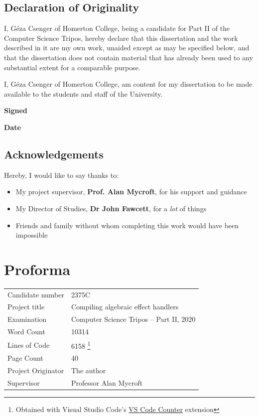 \documentclass[%
    12pt,
    bibliography=toc,
    listof=leveldown,%
    oneside
]{book}
\begin{document}


\frontmatter

\section*{Declaration of Originality}

I, Géza Csenger of Homerton College, being a candidate for Part II of the 
Computer Science Tripos, hereby declare that this dissertation and the work
described in it are my own work, unaided except as may be specified below, and
that the dissertation does not contain material that has already been used to
any substantial extent for a comparable purpose.

I, Géza Csenger of Homerton College,
am content for my dissertation to be made available to the students and staff
of the University. 

\vspace{1cm}
\textbf{Signed}

\vspace{1cm}
\textbf{Date}

\vspace{3cm}

\section*{Acknowledgements}

Hereby, I would like to say thanks to:
\begin{itemize}
    \item My project supervisor, \textbf{Prof. Alan Mycroft}, for his support
        and guidance
    \item My Director of Studies, \textbf{Dr John Fawcett}, for a \emph{lot} of
        things
    \item Friends and family without whom completing this work would have been
        impossible
\end{itemize}

\newpage

\chapter{Proforma}
\begin{tabularx}{\textwidth}{@{} ll @{}}
Candidate number & 2375C \\
Project title & Compiling algebraic effect handlers \\
Examination & Computer Science Tripos -- Part II, 2020 \\
Word Count & 10314 \\
Lines of Code & 6158
\footnote{Obtained with Visual Studio Code's \href{https://marketplace.visualstudio.com/items?itemName=uctakeoff.vscode-counter}{VS Code Counter} extension} \\
Page Count & 40 \\
Project Originator & The author \\
Supervisor & Professor Alan Mycroft \\
\end{tabularx}
\end{document}

